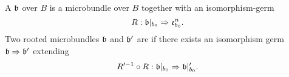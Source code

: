 \begin{mydefinition}
    A  $\mathfrak{b}$ over $B$ is a microbundle over $B$ together with an isomorphism-germ
    \[ R: \mathfrak{b}\vert_{b_0} \Rightarrow{} \mathfrak{e}^{n}_{b_0}. \]
    Two rooted microbundles $\mathfrak{b}$ and $\mathfrak{b}'$ are  if there exists an isomorphism germ $\mathfrak{b} \Rightarrow{} \mathfrak{b}'$ extending
    \[ R'^{-1} \circ R: \mathfrak{b}\vert_{b_0} \Rightarrow{}{} \mathfrak{b}\vert_{b_0}'. \]
\end{mydefinition}